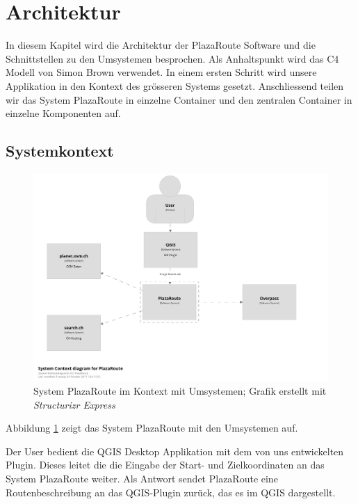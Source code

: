 
\section{Architektur}
\label{sec:Architektur}
In diesem Kapitel wird die Architektur der PlazaRoute Software und die Schnittstellen zu den Umsystemen besprochen. Als Anhaltspunkt wird das C4 Modell \cite{c4model} von Simon Brown verwendet. In einem ersten Schritt wird unsere Applikation in den Kontext des grösseren Systems gesetzt. Anschliessend teilen wir das System PlazaRoute in einzelne Container und den zentralen Container in einzelne Komponenten auf.

\subsection{Systemkontext}
\label{architektur:Systemkontext}

\begin{figure}[ht]
\centering
\includegraphics[width=1\linewidth]{projectdoc/img/system-context_diagram.png}
\caption[System Kontext Diagramm]{System PlazaRoute im Kontext mit Umsystemen; Grafik erstellt mit \emph{Structurizr Express}\cite{structurizr}}
\label{fig:system_context_diagram}
\end{figure}

Abbildung \ref{fig:system_context_diagram} zeigt das System PlazaRoute mit den Umsystemen auf.

Der User bedient die QGIS Desktop Applikation mit dem von uns entwickelten Plugin. Dieses leitet die die Eingabe der Start- und Zielkoordinaten an das System PlazaRoute weiter. Als Antwort sendet PlazaRoute eine Routenbeschreibung an das QGIS-Plugin zurück, das es im QGIS dargestellt.

